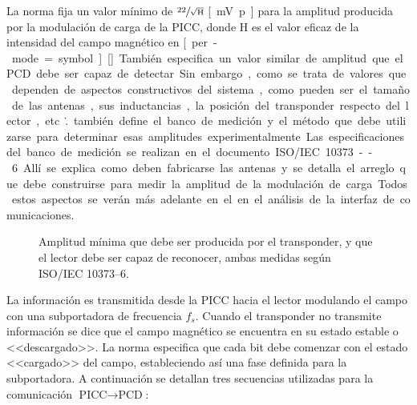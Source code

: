 La norma fija un valor mínimo de \(\sfrac{22}{\sqrt{\text{H}}}\) \si{[
\milli\volt p]} para la amplitud producida por la modulación de carga de la 
PICC, donde H es el valor eficaz de la intensidad del campo magnético en \si
[per-mode=symbol]{[\ampere\per\meter]}. También especifica un valor similar 
de amplitud que el PCD debe ser capaz de detectar. Sin embargo, como se 
trata de valores que dependen de aspectos constructivos del sistema, como 
pueden ser el tamaño de las antenas, sus inductancias, la posición del 
transponder respecto del lector, etc\... también define el banco de medición 
y el método que debe utilizarse para determinar esas amplitudes 
experimentalmente. Las especificaciones del banco de medición se realizan en 
el documento ISO/IEC 10373--6. Allí se explica como deben fabricarse las 
antenas y se detalla el arreglo que debe construirse para medir la amplitud 
de la modulación de carga. Todos estos aspectos se verán más adelante en el 
en el análisis de la interfaz de comunicaciones.

\begin{figure}
	\centering
	
	\caption{Amplitud mínima que debe ser producida por el transponder, y 
	que el lector debe ser capaz de reconocer, ambas medidas según ISO/IEC 
	10373--6.}
	
	\label{fig:AmplitudesPICC_PCD}
\end{figure}

La información es transmitida desde la PICC hacia el lector modulando el 
campo con una subportadora de frecuencia \(f_s\). Cuando el transponder no 
transmite información se dice que el campo magnético se encuentra en su 
estado estable o <<descargado>>. La norma especifica que cada bit debe 
comenzar con el estado <<cargado>> del campo, estableciendo así una fase 
definida para la subportadora. A continuación se detallan tres secuencias 
utilizadas para la comunicación \(\text{PICC} \rightarrow \text{PCD}\):

